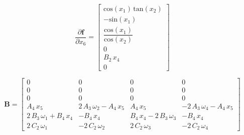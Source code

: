 \begin{equation}
	\dfrac{\partial \boldsymbol{ f}}{\partial  x_6} = 
	\begin{bmatrix}
	\mathrm{cos}\left(x_1 \right)\,\mathrm{tan}\left(x_2 \right)\\
	-\mathrm{sin}\left(x_1 \right)\\
	\dfrac{\mathrm{cos}\left(x_1 \right)}{\mathrm{cos}\left(x_2 \right)}\\
	0\\
	B_2 \,x_4 \\
	0
	\end{bmatrix}
\end{equation}


\begin{equation}\label{B_MIMO}
	\boldsymbol B = \begin{bmatrix}
			0 & 0 & 0 & 0\\
			0 & 0 & 0 & 0\\
			0 & 0 & 0 & 0\\
			A_4 \,x_5  & 2\,A_3 \,\omega_2 -A_4 \,x_5  & A_4 \,x_5  & -2\,A_3 \,\omega_4 -A_4 \,x_5 \\
			2\,B_3 \,\omega_1 +B_4 \,x_4  & -B_4 \,x_4  & B_4 \,x_4 -2\,B_3 \,\omega_3  & -B_4 \,x_4 \\
			2\,C_2 \,\omega_1  & -2\,C_2 \,\omega_2  & 2\,C_2 \,\omega_3  & -2\,C_2 \,\omega_4 
	\end{bmatrix}
\end{equation}
